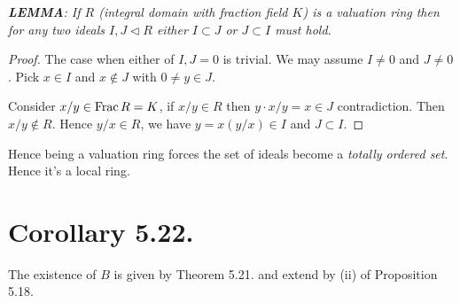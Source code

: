 \textit{\textbf{LEMMA}: If $R$ (integral domain with fraction field $K$) is a valuation ring then for any two ideals $I,J\triangleleft R$ either $I\subset J$ or $J\subset I$ must hold.}
\begin{proof}
	The case when either of $I,J=0$ is trivial. We may assume $I\neq 0$ and $J\neq 0$. Pick $x\in I$ and $x\notin J$ with $0\neq y\in J$. 

	Consider $x/y\in \operatorname{Frac} R=K$, if $x/y\in R$ then $y\cdot x/y=x\in J$ contradiction. Then $x/y\notin R$. Hence $y/x\in R$, we have $y=x(y/x)\in I$ and $J\subset I$.
\end{proof}

Hence being a valuation ring forces the set of ideals become a \textit{totally ordered set}. Hence it's a local ring.

\section{Corollary 5.22.}

The existence of $B$ is given by Theorem 5.21. and extend by (ii) of Proposition 5.18.